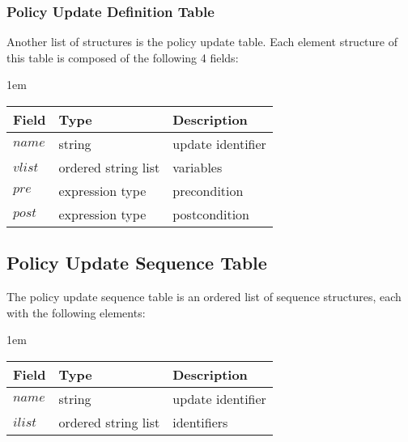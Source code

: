 \documentclass[glov2,twocolumn,final]{svjour2}
\newenvironment{vquote}
  {\begin{list}{}{\leftmargin 1em}\item[]}
  {\end{list}}
\begin{document}
      \subsubsection{Policy Update Definition Table}

        Another list of structures is the policy update table. Each element
        structure of this table is composed of the following 4 fields:

        \begin{vquote}
          \begin{tabular}[t]{|l|l|l|}
            \hline
            \textbf{Field} & \textbf{Type} & \textbf{Description} \\
            \hline
            $name$ & string & update identifier \\
            \hline
            $vlist$ & ordered string list & variables \\
            \hline
            $pre$ & expression type & precondition \\
            \hline
            $post$ & expression type & postcondition \\
            \hline
          \end{tabular}
        \end{vquote}

    \subsection{Policy Update Sequence Table}

      The policy update sequence table is an ordered list of sequence
      structures, each with the following elements:

      \begin{vquote}
        \begin{tabular}[t]{|l|l|l|}
          \hline
          \textbf{Field} & \textbf{Type} & \textbf{Description} \\
          \hline
          $name$ & string & update identifier \\
          \hline
          $ilist$ & ordered string list & identifiers \\
          \hline
        \end{tabular}
      \end{vquote}
\end{document}
